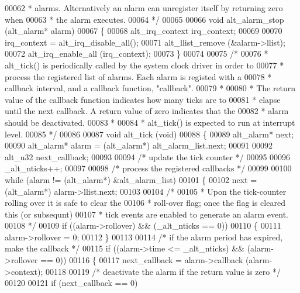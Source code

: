 \begin{DoxyCode}
00062 \textcolor{comment}{ * alarms. Alternatively an alarm can unregister itself by returning zero when }
00063 \textcolor{comment}{ * the alarm executes.}
00064 \textcolor{comment}{ */}
00065 
00066 \textcolor{keywordtype}{void} alt_alarm_stop (alt_alarm* alarm)
00067 \{
00068   alt_irq_context irq\_context;
00069 
00070   irq\_context = alt_irq_disable_all();
00071   alt_llist_remove (&alarm->llist);
00072   alt_irq_enable_all (irq\_context);
00073 \}
00074 
00075 \textcolor{comment}{/*}
00076 \textcolor{comment}{ * alt\_tick() is periodically called by the system clock driver in order to}
00077 \textcolor{comment}{ * process the registered list of alarms. Each alarm is registed with a}
00078 \textcolor{comment}{ * callback interval, and a callback function, "callback". }
00079 \textcolor{comment}{ *}
00080 \textcolor{comment}{ * The return value of the callback function indicates how many ticks are to}
00081 \textcolor{comment}{ * elapse until the next callback. A return value of zero indicates that the}
00082 \textcolor{comment}{ * alarm should be deactivated. }
00083 \textcolor{comment}{ * }
00084 \textcolor{comment}{ * alt\_tick() is expected to run at interrupt level.}
00085 \textcolor{comment}{ */}
00086 
00087 \textcolor{keywordtype}{void} alt_tick (\textcolor{keywordtype}{void})
00088 \{
00089   alt_alarm* next;
00090   alt_alarm* alarm = (alt_alarm*) alt_alarm_list.next;
00091 
00092   alt_u32    next\_callback;
00093 
00094   \textcolor{comment}{/* update the tick counter */}
00095 
00096   _alt_nticks++;
00097 
00098   \textcolor{comment}{/* process the registered callbacks */}
00099 
00100   while (alarm != (alt_alarm*) &alt_alarm_list)
00101   \{
00102     next = (alt_alarm*) alarm->llist.next;
00103 
00104     \textcolor{comment}{/* }
00105 \textcolor{comment}{     * Upon the tick-counter rolling over it is safe to clear the }
00106 \textcolor{comment}{     * roll-over flag; once the flag is cleared this (or subsequnt)}
00107 \textcolor{comment}{     * tick events are enabled to generate an alarm event. }
00108 \textcolor{comment}{     */}
00109     if ((alarm->rollover) && (_alt_nticks == 0))
00110     \{
00111       alarm->rollover = 0;
00112     \}
00113     
00114     \textcolor{comment}{/* if the alarm period has expired, make the callback */}    
00115     \textcolor{keywordflow}{if} ((alarm->time <= _alt_nticks) && (alarm->rollover == 0))
00116     \{
00117       next\_callback = alarm->callback (alarm->context);
00118 
00119       \textcolor{comment}{/* deactivate the alarm if the return value is zero */}
00120 
00121       \textcolor{keywordflow}{if} (next\_callback == 0)

\end{DoxyCode}
